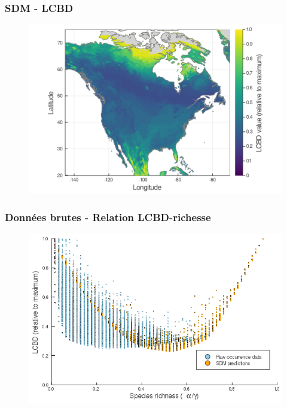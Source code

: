 \documentclass[10pt]{beamer}
\begin{document}
\begin{frame}
  \frametitle{SDM - LCBD}
  \begin{figure}
    \centering
    \hspace*{-0cm}\includegraphics[scale=0.17]{fig/05_sdm_lcbd.png}
  \end{figure}
\end{frame}

\begin{frame}
  \frametitle{Données brutes - Relation LCBD-richesse}
  \begin{figure}
    \centering
    \includegraphics[scale=0.4]{fig/06_cmb_relation-oneplot.png}
  \end{figure}
\end{frame}
\end{document}
